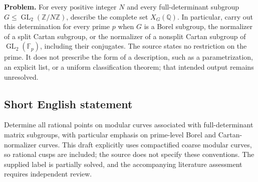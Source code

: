 \documentclass[11pt]{article}
\newcommand{\Z}{\mathbb{Z}}
\newcommand{\Q}{\mathbb{Q}}
\newcommand{\F}{\mathbb{F}}
\begin{document}
\textbf{Problem.} For every positive integer \(N\) and every full-determinant subgroup \(G\leq\operatorname{GL}_2(\Z/N\Z)\), describe the complete set \(X_G(\Q)\). In particular, carry out this determination for every prime \(p\) when \(G\) is a Borel subgroup, the normalizer of a split Cartan subgroup, or the normalizer of a nonsplit Cartan subgroup of \(\operatorname{GL}_2(\F_p)\), including their conjugates. The source states no restriction on the prime. It does not prescribe the form of a description, such as a parametrization, an explicit list, or a uniform classification theorem; that intended output remains unresolved.
\subsection{Short English statement}
Determine all rational points on modular curves associated with full-determinant matrix subgroups, with particular emphasis on prime-level Borel and Cartan-normalizer curves. This draft explicitly uses compactified coarse modular curves, so rational cusps are included; the source does not specify these conventions. The supplied label is partially solved, and the accompanying literature assessment requires independent review.
\end{document}
